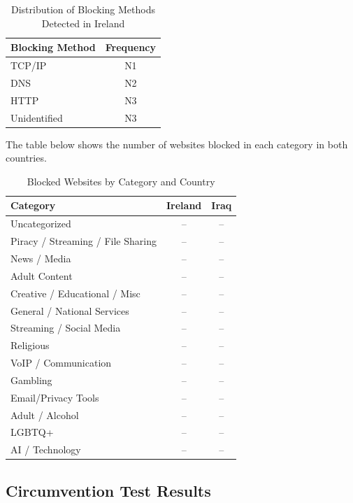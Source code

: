 \begin{table}[H]
\centering
\caption{Distribution of Blocking Methods Detected in Ireland}
\begin{tabular}{lc}
\toprule
\textbf{Blocking Method} & \textbf{Frequency} \\
\midrule
TCP/IP          & N1 \\
DNS & N2 \\
HTTP & N3 \\
Unidentified & N3 \\
\bottomrule
\end{tabular}
\label{tab:ireland_blocking_methods}
\end{table}

The table below shows the number of websites blocked in each category in both countries.

\begin{table}[H]
\centering
\caption{Blocked Websites by Category and Country}
\begin{tabular}{lcc}
\toprule
\textbf{Category} & \textbf{Ireland} & \textbf{Iraq} \\
\midrule
Uncategorized                       & -- & -- \\
Piracy / Streaming / File Sharing   & -- & -- \\
News / Media                        & -- & -- \\
Adult Content                       & -- & -- \\
Creative / Educational / Misc       & -- & -- \\
General / National Services         & -- & -- \\
Streaming / Social Media            & -- & -- \\
Religious                           & -- & -- \\
VoIP / Communication                & -- & -- \\
Gambling                            & -- & -- \\
Email/Privacy Tools                 & -- & -- \\
Adult / Alcohol                     & -- & -- \\
LGBTQ+                              & -- & -- \\
AI / Technology                     & -- & -- \\
\bottomrule
\end{tabular}
\label{tab:category_block}
\end{table}

\subsection{Circumvention Test Results}



